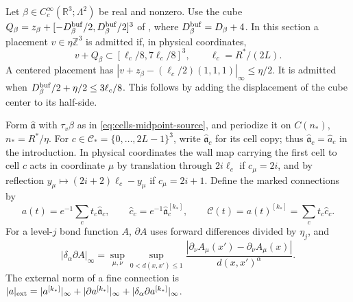 \documentclass[11pt,letterpaper,reqno]{amsart}
\newcommand{\R}{\mathbb R}
\newcommand{\Z}{\mathbb Z}
\begin{document}
Let $\beta\in C_c^\infty(\R^3;\Lambda^2)$ be real
and nonzero. Use the cube
$Q_\beta=z_\beta+[-D_\beta^{\rm buf}/2,D_\beta^{\rm buf}/2]^3$
of ,
where $D_\beta^{\rm buf}=D_\beta+4$.
In this section a placement $v\in\eta\Z^3$
is admitted if, in physical coordinates,
\begin{equation}\label{eq:interacting-admitted-placement}
              v+Q_\beta\subset[\ell_c/8,7\ell_c/8]^3,
              \qquad \ell_c=R^*/(2L).
\end{equation}
A centered placement has
$|v+z_\beta-(\ell_c/2)(1,1,1)|_\infty\le\eta/2$.
It is admitted when
$D_\beta^{\rm buf}/2+\eta/2\le3\ell_c/8$.
This follows by adding the displacement
of the cube center to its half-side.

Form $\widehat{\mathfrak a}$ with $\tau_v\beta$
as in \eqref{eq:cells-midpoint-source}, and
periodize it on $C(n_*)$, $n_*=R^*/\eta$.
For $c\in\mathcal C_*=\{0,\ldots,2L-1\}^3$,
write $\widehat{\mathfrak a}_c$ for its
cell copy; thus $\widehat{\mathfrak a}_c=\widehat a_c$ in the
introduction. In physical coordinates the
wall map carrying the first cell to cell $c$
acts in coordinate $\mu$ by translation through
$2i\ell_c$ if $c_\mu=2i$, and by reflection
$y_\mu\mapsto(2i+2)\ell_c-y_\mu$ if $c_\mu=2i+1$.
Define the marked connections by
\begin{equation}\label{eq:interacting-marked-connections}
 a(t)=e^{-1}\sum_ct_c\widehat{\mathfrak a}_c,\qquad
 \widehat c_c=e^{-1}\widehat{\mathfrak a}_c^{[k_*]},\qquad
 \mathscr C(t)=a(t)^{[k_*]}=\sum_ct_c\widehat c_c .
\end{equation}
For a level-$j$ bond function $A$, $\partial A$
uses forward differences divided by $\eta_j$,
and
\[
 |\delta_\alpha\partial A|_\infty
  =\sup_{\mu,\nu}\sup_{0<d(x,x')\le1}
     \frac{|\partial_\nu A_\mu(x')-\partial_\nu A_\mu(x)|}
          {d(x,x')^\alpha}.
\]
The external norm of a fine connection is
$|a|_{\rm ext}=|a^{[k_*]}|_\infty+
|\partial a^{[k_*]}|_\infty+
|\delta_\alpha\partial a^{[k_*]}|_\infty$.
\end{document}
